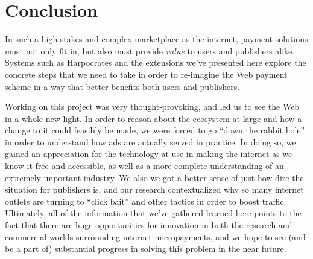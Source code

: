 \section{Conclusion}
In such a high-stakes and complex marketplace as the internet, payment solutions must not only fit in, but also must provide \textit{value} to users and publishers alike.
Systems such as Harpocrates and the extensions we've presented here explore the concrete steps that we need to take in order to re-imagine the Web payment scheme in a way that better benefits both users and publishers.

Working on this project was very thought-provoking, and led us to see the Web in a whole new light.
In order to reason about the ecosystem at large and how a change to it could feasibly be made, we were forced to go ``down the rabbit hole'' in order to understand how ads are actually served in practice.
In doing so, we gained an appreciation for the technology at use in making the internet as we know it free and accessible, as well as a more complete understanding of an extremely important industry.
We also we got a better sense of just how dire the situation for publishers is, and our research contextualized why so many internet outlets are turning to ``click bait'' and other tactics in order to boost traffic.
Ultimately, all of the information that we've gathered learned here points to the fact that there are huge opportunities for innovation in both the research and commercial worlds surrounding internet micropayments, and we hope to see (and be a part of) substantial progress in solving this problem in the near future.
